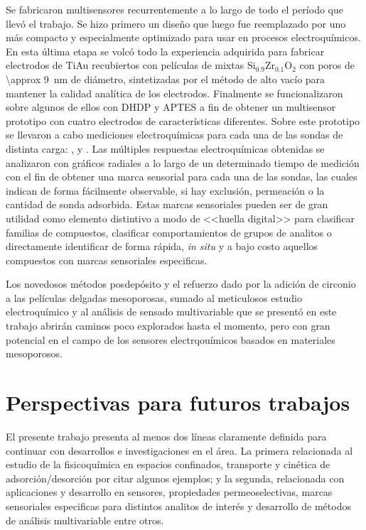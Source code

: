  Se fabricaron multisensores recurrentemente a lo largo de todo el período que llevó el trabajo. Se hizo primero un diseño que luego fue reemplazado por uno más compacto y especialmente optimizado para usar en procesos electroquímicos. En esta última etapa se volcó todo la experiencia adquirida para fabricar electrodos de Ti\textbar Au recubiertos con películas de mixtas Si$_{0.9}$Zr$_{0.1}$O$_2$ con poros de \SI{\approx 9}{\nm} de diámetro, sintetizadas por el método de alto vacío para mantener la calidad analítica de los electrodos. Finalmente se funcionalizaron sobre algunos de ellos con DHDP y APTES a fin de obtener un multisensor prototipo con cuatro electrodos de características diferentes. Sobre este prototipo se llevaron a cabo mediciones electroquímicas para cada una de las sondas de distinta carga: \ferroferri, \ferroceno\space y \aminorutenio. Las múltiples respuestas electroquímicas obtenidas se analizaron con gráficos radiales a lo largo de un determinado tiempo de medición con el fin de obtener una marca sensorial para cada una de las sondas, las cuales indican de forma fácilmente observable, si hay exclusión, permeación o la cantidad de sonda adsorbida. Estas marcas sensoriales pueden ser de gran utilidad como elemento distintivo a modo de <<huella digital>> para clasificar familias de compuestos, clasificar comportamientos de grupos de analitos o directamente identificar de forma rápida, \textit{in situ} y a bajo costo aquellos compuestos con marcas sensoriales especificas.

 Los novedosos métodos posdepósito y el refuerzo dado por la adición de circonio a las películas delgadas mesoporosas, sumado al meticulosos estudio electroquímico y al análisis de sensado multivariable que se presentó en este trabajo abrirán caminos poco explorados hasta el momento, pero con gran potencial en el campo de los sensores electrqouímicos basados en materiales mesoporosos.

\section{Perspectivas para futuros trabajos}
 
 		El presente trabajo presenta al menos dos líneas claramente definida para continuar con desarrollos e investigaciones en el área. La primera relacionada al estudio de la fisicoquímica en espacios confinados, transporte y cinética de adsorción/desorción por citar algunos ejemplos; y la segunda, relacionada con aplicaciones y desarrollo en sensores, propiedades permeoselectivas, marcas sensoriales especificas para distintos analitos de interés y desarrollo de métodos de análisis multivariable entre otros.
 
